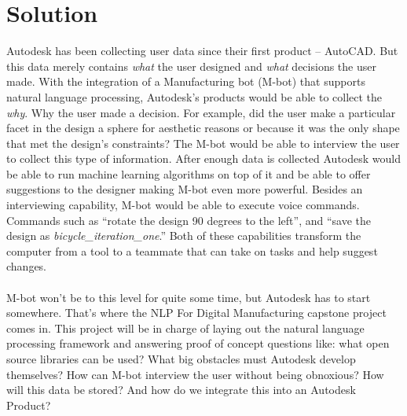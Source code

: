 \documentclass[onecolumn, draftclsnofoot,10pt, compsoc]{IEEEtran}
\begin{document}
\section{Solution}
Autodesk has been collecting user data since their first product – AutoCAD. But this data merely contains \textit{what} the user designed and \textit{what} decisions the user made. With the integration of a Manufacturing bot (M-bot) that supports natural language processing, Autodesk’s products would be able to collect the \textit{why}. Why the user made a decision. For example, did the user make a particular facet in the design a sphere for aesthetic reasons or because it was the only shape that met the design’s constraints? The M-bot would be able to interview the user to collect this type of information. After enough data is collected Autodesk would be able to run machine learning algorithms on top of it and be able to offer suggestions to the designer making M-bot even more powerful. Besides an interviewing capability, M-bot would be able to execute voice commands. Commands such as “rotate the design 90 degrees to the left”, and “save the design as \textit{bicycle\_iteration\_one}.” Both of these capabilities transform the computer from a tool to a teammate that can take on tasks and help suggest changes.
\\ \\ 
M-bot won’t be to this level for quite some time, but Autodesk has to start somewhere. That’s where the NLP For Digital Manufacturing capstone project comes in. This project will be in charge of laying out the natural language processing framework and answering proof of concept questions like: what open source libraries can be used? What big obstacles must Autodesk develop themselves? How can M-bot interview the user without being obnoxious? How will this data be stored? And how do we integrate this into an Autodesk Product?
\end{document}

